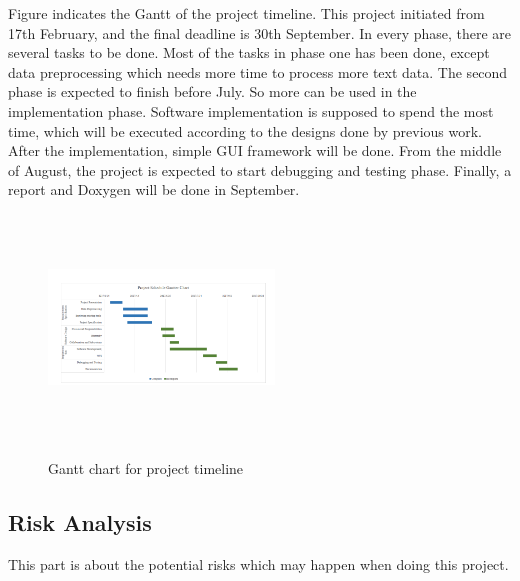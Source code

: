 Figure \label{gantterChart} indicates the Gantt of the project timeline. This project initiated from 17th February, and the final deadline is 30th September. In every phase, there are several tasks to be done. Most of the tasks in phase one has been done, except data preprocessing which needs more time to process more text data. The second phase is expected to finish before July. So more can be used in the implementation phase. Software implementation is supposed to spend the most time, which will be executed according to the designs done by previous work. After the implementation, simple GUI framework will be done. From the middle of August, the project is expected to start debugging and testing phase. Finally, a report and Doxygen will be done in September. 

\begin{figure}[h]
	\centering	
	\includegraphics[width=6cm, height=6cm]{Figs/Gantter-Chart}\\[1ex]
	\caption{Gantt chart for project timeline }
	\label{fig:gantterChart}
\end{figure}


\subsection{Risk Analysis}

This part is about the potential risks which may happen when doing this project.

